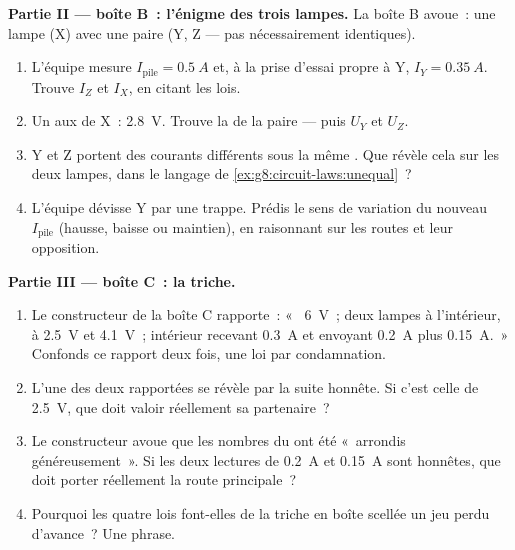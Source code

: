 \begin{problem}
\medskip\noindent\textbf{Partie II --- boîte B~: l'énigme des trois
lampes.}
La boîte B avoue~: une lampe (X)  avec une paire  (Y, Z --- pas nécessairement identiques).
\begin{enumerate}[resume]
  \item L'équipe mesure $I_{\text{pile}} = \qty{0.5}{A}$ et, à la
        prise d'essai propre à Y, $I_Y = \qty{0.35}{A}$. Trouve
        $I_Z$ et $I_X$, en citant les lois.
  \item Un  aux  de X~: \qty{2.8}{V}. Trouve la
         de la paire  --- puis $U_Y$ et $U_Z$.
  \item Y et Z portent des courants différents sous la même .
        Que révèle cela sur les deux lampes, dans le langage de
        \cref{ex:g8:circuit-laws:unequal}~?
  \item L'équipe dévisse Y par une trappe. Prédis le sens de
        variation du nouveau $I_{\text{pile}}$ (hausse, baisse ou
        maintien), en raisonnant sur les routes et leur opposition.
\end{enumerate}

\medskip\noindent\textbf{Partie III --- boîte C~: la triche.}
\begin{enumerate}[resume]
  \item Le constructeur de la boîte C rapporte~: «~
        \qty{6}{V}~; deux lampes  à l'intérieur, à
        \qty{2.5}{V} et \qty{4.1}{V}~;  intérieur recevant
        \qty{0.3}{A} et envoyant \qty{0.2}{A} plus \qty{0.15}{A}.~»
        Confonds ce rapport deux fois, une loi par condamnation.
  \item L'une des deux  rapportées se révèle par la suite
        honnête. Si c'est celle de \qty{2.5}{V}, que doit valoir
        réellement sa partenaire~?
  \item Le constructeur avoue que les nombres du  ont été
        «~arrondis généreusement~». Si les deux lectures de 
        \qty{0.2}{A} et \qty{0.15}{A} sont honnêtes, que doit porter
        réellement la route principale~?
  \item Pourquoi les quatre lois font-elles de la triche en boîte
        scellée un jeu perdu d'avance~? Une phrase.
\end{enumerate}


\end{problem}
